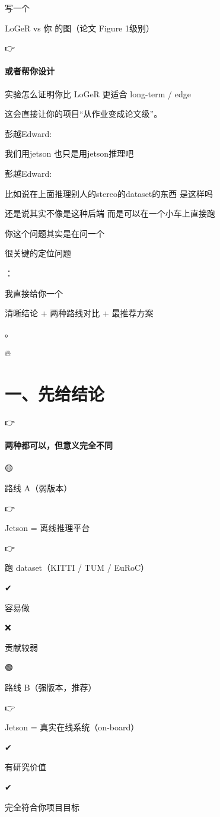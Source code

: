 \documentclass[12pt]{article}
\begin{document}
写一个

LoGeR vs 你 的图（论文 Figure 1级别）

👉

\paragraph{或者帮你设计}
实验怎么证明你比 LoGeR 更适合 long-term / edge

这会直接让你的项目“从作业变成论文级”。

彭越Edward:

我们用jetson 也只是用jetson推理吧

彭越Edward:

比如说在上面推理别人的stereo的dataset的东西 是这样吗

还是说其实不像是这种后端 而是可以在一个小车上直接跑

你这个问题其实是在问一个

很关键的定位问题

：

我直接给你一个

清晰结论 + 两种路线对比 + 最推荐方案

。

🔥

\section{一、先给结论}
👉

\paragraph{两种都可以，但意义完全不同}
🟡

路线 A（弱版本）

👉

Jetson = 离线推理平台

👉

跑 dataset（KITTI / TUM / EuRoC）

✔

容易做

❌

贡献较弱

🟢

路线 B（强版本，推荐）

👉

Jetson = 真实在线系统（on-board）

✔

有研究价值

✔

完全符合你项目目标
\end{document}
